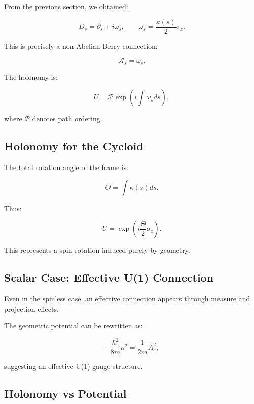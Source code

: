 \documentclass[11pt]{article}
\begin{document}
From the previous section, we obtained:

\begin{equation}
D_s = \partial_s + i \omega_s, \qquad
\omega_s = \frac{\kappa(s)}{2}\sigma_z.
\end{equation}

This is precisely a non-Abelian Berry connection:

\begin{equation}
\mathcal{A}_s = \omega_s.
\end{equation}

The holonomy is:

\begin{equation}
U = \mathcal{P} \exp\left(i \int \omega_s ds \right),
\end{equation}

where $\mathcal{P}$ denotes path ordering.

\subsection{Holonomy for the Cycloid}

The total rotation angle of the frame is:

\begin{equation}
\Theta = \int \kappa(s) ds.
\end{equation}

Thus:

\begin{equation}
U = \exp\left( i \frac{\Theta}{2} \sigma_z \right).
\end{equation}

This represents a spin rotation induced purely by geometry.

\subsection{Scalar Case: Effective U(1) Connection}

Even in the spinless case, an effective connection appears through measure and projection effects.

The geometric potential can be rewritten as:

\begin{equation}
-\frac{\hbar^2}{8m}\kappa^2
= \frac{1}{2m} A_s^2,
\end{equation}

suggesting an effective U(1) gauge structure.

\subsection{Holonomy vs Potential}
\end{document}
